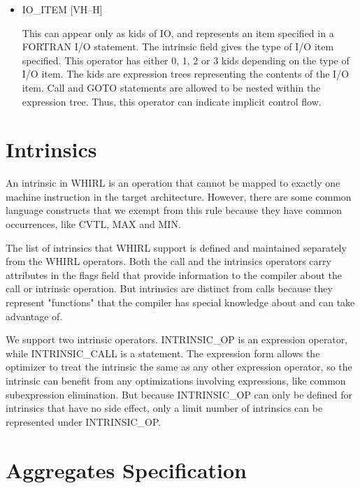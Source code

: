 \documentclass{article}
\begin{document}
\begin{itemize}
\item 
{}%
IO\_ITEM \hfill [VH--H]

This can appear only as kids of
%
IO, and represents an item specified
in a FORTRAN I/O statement. The intrinsic field gives the type of
I/O item specified. This operator has either 0, 1, 2 or 3 kids depending on
the type of I/O item. The kids are expression trees representing
the contents of the I/O item. Call and
%
GOTO statements are allowed
to be nested within the expression tree. Thus, this operator can
indicate implicit control flow.

\end{itemize}
\section{Intrinsics}

An intrinsic in WHIRL is an operation that cannot be mapped to
exactly one machine instruction in the target architecture. However,
there are some common language constructs that we exempt from this
rule because they have common occurrences, like
%
CVTL,
%
MAX and
%
MIN.

The list of intrinsics that WHIRL support is defined and maintained
separately from the WHIRL operators. Both the call and the intrinsics
operators carry attributes in the flags field that provide information
to the compiler about the call or intrinsic operation. But intrinsics
are distinct from calls because they represent "functions" that
the compiler has special knowledge about and can take advantage
of.

We support two intrinsic operators. 
%
INTRINSIC\_OP is an expression
operator, while 
%
INTRINSIC\_CALL is a statement. The expression form allows the
optimizer to treat the intrinsic the same as any other expression
operator, so the intrinsic can benefit from any optimizations
involving expressions, like common subexpression elimination. But
because 
%
INTRINSIC\_OP can only be defined for intrinsics that have
no side effect, only a limit number of intrinsics can be represented
under 
%
INTRINSIC\_OP.

\section{Aggregates Specification}
\end{document}
